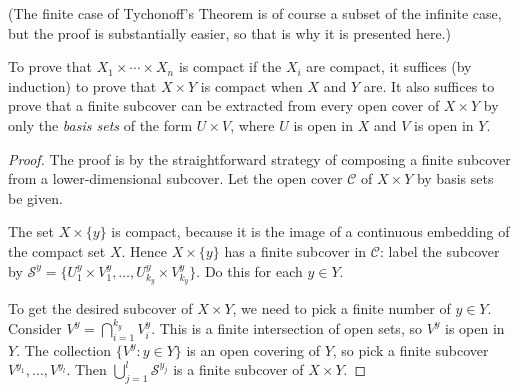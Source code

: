 \documentclass[12pt]{article}
\begin{document}
(The finite case of Tychonoff's Theorem is of course a subset of the infinite case,
but the proof is substantially easier, so that is why it is presented here.)

To prove that $X_1 \times \dotsm \times X_n$ is compact
if the $X_i$ are compact, it suffices (by induction) to prove that $X \times Y$ is compact
when $X$ and $Y$ are.  It also suffices to prove that 
a finite subcover can be extracted from every open cover of $X \times Y$
by only the \emph{basis sets} of the form $U \times V$, where $U$ is open in $X$ and $V$ is open in $Y$.

\begin{proof}
The proof is by the straightforward strategy of composing a finite subcover
from a lower-dimensional subcover.  Let the open cover $\mathcal{C}$ of $X \times Y$
by basis sets be given.  

The set $X \times \{ y \}$ is compact, because it is the image of a 
continuous embedding of the compact set $X$.
Hence $X \times \{ y \}$ has a finite subcover in $\mathcal{C}$: label the subcover
by $\mathcal{S}^y = \{ U_1^y \times V_1^y, \dotsc, U_{k_y}^y \times V_{k_y}^y \}$.
Do this for each $y \in Y$.

To get the desired subcover of $X \times Y$, we need to pick a finite number
of $y \in Y$.  Consider $V^y = \bigcap_{i=1}^{k_y} V_i^y$.
This is a finite intersection of open sets, so $V^y$ is open in $Y$.
The collection $\{ V^y : y \in Y\}$ is an open covering of $Y$, so pick
a finite subcover $ V^{y_1}, \dotsc, V^{y_l}$.
Then $\bigcup_{j=1}^l \mathcal{S}^{y_j}$ is a finite subcover
of $X \times Y$.
\end{proof}
\end{document}
